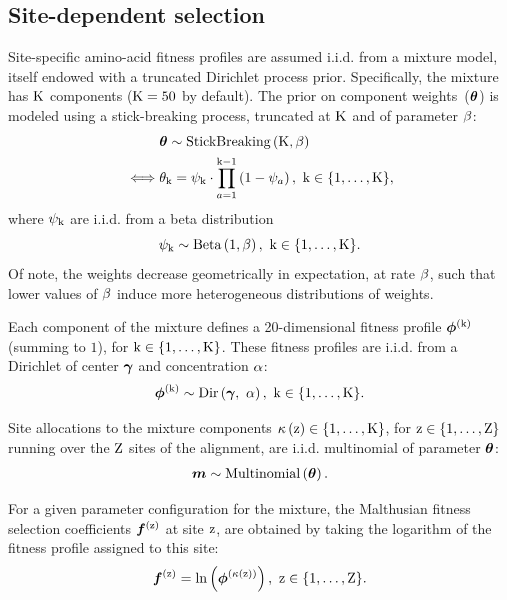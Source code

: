 \documentclass{article}
\begin{document}
\subsection{Site-dependent selection}
\label{sec:profiles}
Site-specific amino-acid fitness profiles are assumed i.i.d. from a mixture model, itself endowed with a truncated Dirichlet process prior.
Specifically, the mixture has $\text{K}$ components ($\text{K} = 50$ by default).
The prior on component weights~($\bm{\theta}$) is modeled using a stick-breaking process, truncated at $\text{K}$ and of parameter $\beta$:
\begin{align}
    \label{eq:DistribStickBreaking}
    \begin{split}
        & \bm{\theta} \sim \text{StickBreaking}\left( \text{K}, \beta \right)\\
        \iff & \theta_{\text{k}} = \psi_{\text{k}}\cdot \prod _{{a=1}}^{{\text{k}-1}}\left(1-\psi_{a}\right),\ \text{k} \in \{1, \hdots, \text{K}\},
    \end{split}
\end{align}
where $\psi_{\text{k}}$ are i.i.d. from a beta distribution
\begin{equation}
    \label{eq:Beta}
    \psi_{\text{k}} \sim \text{Beta}\left( 1, \beta \right),\ \text{k} \in \{1, \hdots, \text{K}\}.
\end{equation}
Of note, the weights decrease geometrically in expectation, at rate $\beta$, such that lower values of $\beta$ induce more heterogeneous distributions of weights.

Each component of the mixture defines a 20-dimensional fitness profile $\bm{\phi}^{(\text{k})}$ (summing to $1$), for $ \text{k} \in \{1, \hdots, \text{K}\}$.
These fitness profiles are i.i.d. from a Dirichlet of center $\bm{\gamma}$ and concentration $\alpha$:
\begin{equation}
    \label{eq:DistribBase}
    \Profile\catexp \sim \text{Dir}\left( \centerProfile,\ \concentrationProfile \right),\ \Setcat.
\end{equation}

Site allocations to the mixture components $\kappa\left(\text{z}\right) \in \{1, \hdots, \text{K}\} $, for $\text{z} \in \{1, \hdots, \text{Z}\}$ running over the $\text{Z}$ sites of the alignment, are i.i.d. multinomial of parameter $\bm{\theta}$:
\begin{align}
    \label{eq:DistribMultinomial}
    \bm{m} \sim \text{Multinomial}\left( \bm{\theta} \right).
\end{align}

For a given parameter configuration for the mixture, the Malthusian fitness selection coefficients $\bm{f}^{(\text{z})}$ at site $\text{z}$, are obtained by taking the logarithm of the fitness profile assigned to this site:
\begin{equation}
    \label{eq:sitefitness}
    \bm{f}^{(\text{z})} = \ln \left( \bm{\phi}^{\left( \kappa\left(\text{z}\right) \right)} \right),\ \text{z} \in \{1, \hdots, \text{Z}\}.
\end{equation}
\end{document}
